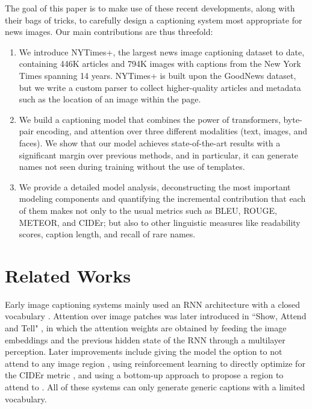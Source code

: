 \documentclass[10pt,twocolumn,letterpaper]{article}
\begin{document}
The goal of this paper is to make use of these recent developments, along with
their bags of tricks, to carefully design a captioning system most appropriate
for news images. Our main contributions are thus threefold:

\begin{enumerate}
   \item We introduce NYTimes+, the largest news image captioning dataset to
   date, containing 446K articles and 794K images with captions from the New
   York Times spanning 14 years. NYTimes+ is built upon the GoodNews dataset,
   but we write a custom parser to collect higher-quality articles and metadata
   such as the location of an image within the page.

   \item We build a captioning model that combines the power of transformers,
   byte-pair encoding, and attention over three different modalities (text,
   images, and faces). We show that our model achieves state-of-the-art results
   with a significant margin over previous methods, and in particular, it can
   generate names not seen during training without the use of templates.

   \item We provide a detailed model analysis, deconstructing the most
   important modeling components and quantifying the incremental contribution
   that each of them makes not only to the usual metrics such as BLEU, ROUGE,
   METEOR, and CIDEr; but also to other linguistic measures like readability
   scores, caption length, and recall of rare names.
\end{enumerate}


\section{Related Works}

Early image captioning systems mainly used an RNN architecture with a closed
vocabulary \cite{Karpathy2015DeepVA, Donahue2015LongTR, Vinyals2015ShowAT}.
Attention over image patches was later introduced in ``Show, Attend and Tell"
\cite{Xu2015ShowAA}, in which the attention weights are obtained by feeding the
image embeddings and the previous hidden state of the RNN through a multilayer
perception. Later improvements include giving the model the option to not
attend to any image region \cite{Lu2017KnowingWT}, using reinforcement learning
to directly optimize for the CIDEr metric \cite{Rennie2017SelfCriticalST}, and
using a bottom-up approach to propose a region to attend to
\cite{Anderson2017BottomUpAT}. All of these systems can only generate generic
captions with a limited vocabulary.
\end{document}
